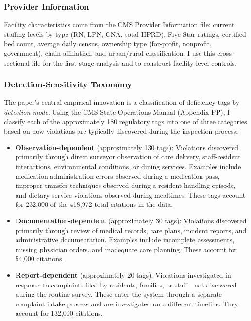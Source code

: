 \documentclass[12pt]{article}
\begin{document}
\subsubsection{Provider Information} Facility characteristics come from the CMS Provider Information file: current staffing levels by type (RN, LPN, CNA, total HPRD), Five-Star ratings, certified bed count, average daily census, ownership type (for-profit, nonprofit, government), chain affiliation, and urban/rural classification. I use this cross-sectional file for the first-stage analysis and to construct facility-level controls.

\subsubsection{Detection-Sensitivity Taxonomy} The paper's central empirical innovation is a classification of deficiency tags by \textit{detection mode}. Using the CMS State Operations Manual (Appendix PP), I classify each of the approximately 180 regulatory tags into one of three categories based on how violations are typically discovered during the inspection process:

\begin{itemize}
\item \textbf{Observation-dependent} (approximately 130 tags): Violations discovered primarily through direct surveyor observation of care delivery, staff-resident interactions, environmental conditions, or dining services. Examples include medication administration errors observed during a medication pass, improper transfer techniques observed during a resident-handling episode, and dietary service violations observed during mealtimes. These tags account for 232,000 of the 418,972 total citations in the data.

\item \textbf{Documentation-dependent} (approximately 30 tags): Violations discovered primarily through review of medical records, care plans, incident reports, and administrative documentation. Examples include incomplete assessments, missing physician orders, and inadequate care planning. These account for 54,000 citations.

\item \textbf{Report-dependent} (approximately 20 tags): Violations investigated in response to complaints filed by residents, families, or staff---not discovered during the routine survey. These enter the system through a separate complaint intake process and are investigated on a different timeline. They account for 132,000 citations.
\end{itemize}
\end{document}
